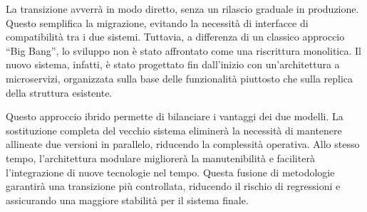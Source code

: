 La transizione avverrà in modo diretto, senza un rilascio graduale in produzione. Questo semplifica la migrazione, evitando la necessità di interfacce di compatibilità tra i due sistemi. Tuttavia, a differenza di un classico approccio ``Big Bang'', lo sviluppo non è stato affrontato come una riscrittura monolitica. Il nuovo sistema, infatti, è stato progettato fin dall'inizio con un'architettura a microservizi, organizzata sulla base delle funzionalità piuttosto che sulla replica della struttura esistente.

Questo approccio ibrido permette di bilanciare i vantaggi dei due modelli. La sostituzione completa del vecchio sistema eliminerà la necessità di mantenere allineate due versioni in parallelo, riducendo la complessità operativa. Allo stesso tempo, l'architettura modulare migliorerà la manutenibilità e faciliterà l'integrazione di nuove tecnologie nel tempo. Questa fusione di metodologie garantirà una transizione più controllata, riducendo il rischio di regressioni e assicurando una maggiore stabilità per il sistema finale.
